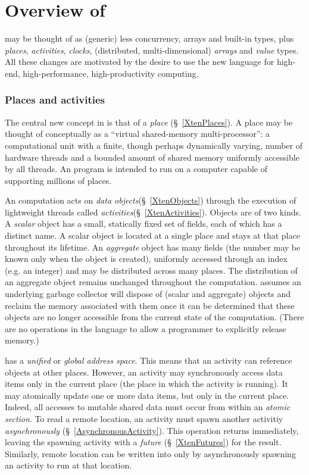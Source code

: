 \chapter{Overview of \Xten}

\Xten{} may be thought of as (generic) \java{} less concurrency, arrays and built-in types,  plus {\em places}, {\em activities}, {\em clocks}, (distributed,
multi-dimensional) {\em arrays} and {\em value} types. All these changes are
motivated by the desire to use the new language for high-end,
high-performance, high-productivity computing.

\subsection{Places and activities}
The central new concept in \Xten{} is that of a {\em place}
(\S~\ref{XtenPlaces}).  A place may be thought of conceptually as a
``virtual shared-memory multi-processor'': a computational unit with a
finite, though perhaps dynamically varying, number of hardware threads
and a bounded amount of shared memory uniformly accessible by all
threads.  An \Xten{} program is intended to run on a computer capable
of supporting millions of places.

An \Xten{} computation acts on {\em data
objects}(\S~\ref{XtenObjects}) through the execution of lightweight
threads called {\em activities}(\S~\ref{XtenActivities}).  Objects are
of two kinds. A {\em scalar} object has a small, statically fixed set
of fields, each of which has a distinct name. A scalar object is
located at a single place and stays at that place throughout its
lifetime.  An {\em aggregate} object has many fields (the number may
be known only when the object is created), uniformly accessed through
an index (e.g.{} an integer) and may be distributed across many
places. The distribution of an aggregate object remains unchanged
throughout the computation. \Xten{} assumes an underlying garbage
collector will dispose of (scalar and aggregate) objects and reclaim
the memory associated with them once it can be determined that these
objects are no longer accessible from the current state of the
computation. (There are no operations in the language to allow a
programmer to explicitly release memory.)

{}\Xten{} has a {\em unified} or {\em global address space}. This
means that an activity can reference objects at other places.
However, an activity may synchronously access data items only in the
current place (the place in which the activity is running). It may
atomically update one or more data items, but only in the current
place.  Indeed, all accesses to mutable shared data must occur from
within an {\em atomic section}. To read a remote location, an activity
must spawn another activitiy {\em asynchronously}
(\S~\ref{AsynchronousActivity}). This operation returns immediately,
leaving the spawning activity with a {\em future}
(\S~\ref{XtenFutures}) for the result. Similarly, remote location can
be written into only by asynchronously spawning an activity to run at
that location.

